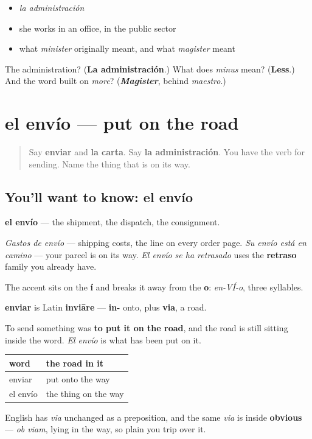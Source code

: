 \begin{itemize}
\raggedright
  \item \emph{la administración}
  \item she works in an office, in the public sector
  \item what \emph{minister} originally meant, and what \emph{magister} meant
\end{itemize}

\begin{tcolorbox}[breakable,colback=teal!4,colframe=teal!35!black,title={Before you move on}]
The administration? (\textbf{La administración}.) What does \emph{minus} mean? (\textbf{Less}.) And the word built on \emph{more}? (\emph{\textbf{Magister}}, behind \emph{maestro}.)
\end{tcolorbox}
\section[el envío]{el envío — put on the road}

\label{lesson:ES-C442-envio}



\begin{quote}
Say \textbf{enviar} and \textbf{la carta}. Say \textbf{la administración}. You have the verb for sending. Name the thing that is on its way.
\end{quote}

\subsection*{You'll want to know: el envío}
\textbf{el envío} — the shipment, the dispatch, the consignment.

\emph{Gastos de envío} — shipping costs, the line on every order page. \emph{Su envío está en camino} — your parcel is on its way. \emph{El envío se ha retrasado} uses the \textbf{retraso} family you already have.

The accent sits on the \textbf{í} and breaks it away from the \textbf{o}: \emph{en-VÍ-o}, three syllables.

\begin{cousinweb}
\textbf{enviar} is Latin \textbf{inviāre} — \textbf{in-} onto, plus \textbf{via}, a road.

To send something was \textbf{to put it on the road}, and the road is still sitting inside the word. \emph{El envío} is what has been put on it.

\noindent
\begin{tabularx}{\linewidth}{@{}>{\raggedright\arraybackslash}X>{\raggedright\arraybackslash}X@{}}
\toprule
\textbf{word} & \textbf{the road in it} \\
\midrule
enviar & put onto the way \\
el envío & the thing on the way \\
\bottomrule
\end{tabularx}

English has \emph{via} unchanged as a preposition, and the same \emph{via} is inside \textbf{obvious} — \emph{ob viam}, lying in the way, so plain you trip over it.
\end{cousinweb}

